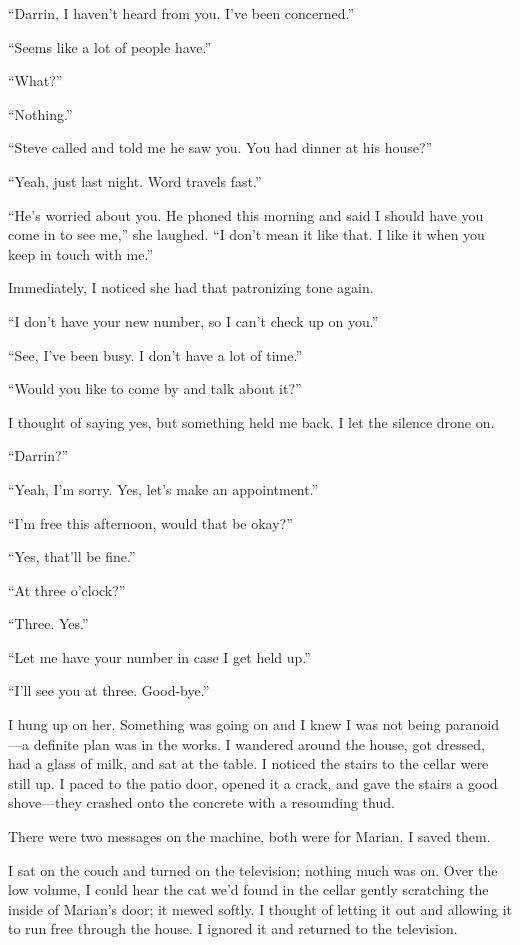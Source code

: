 ``Darrin, I haven't heard from you. I've been concerned.''

``Seems like a lot of people have.''

``What?''

``Nothing.''

``Steve called and told me he saw you. You had dinner at his house?''

``Yeah, just last night. Word travels fast.''

``He's worried about you. He phoned this morning and said I should have
you come in to see me,'' she laughed. ``I don't mean it like that. I
like it when you keep in touch with me.''

Immediately, I noticed she had that patronizing tone again.

``I don't have your new number, so I can't check up on you.''

``See, I've been busy. I don't have a lot of time.''

``Would you like to come by and talk about it?''

I thought of saying yes, but something held me back. I let the silence
drone on.

``Darrin?''

``Yeah, I'm sorry. Yes, let's make an appointment.''

``I'm free this afternoon, would that be okay?''

``Yes, that'll be fine.''

``At three o'clock?''

``Three. Yes.''

``Let me have your number in case I get held up.''

``I'll see you at three. Good-bye.''

I hung up on her. Something was going on and I knew I was not being
paranoid---a definite plan was in the works. I wandered around the
house, got dressed, had a glass of milk, and sat at the table. I noticed
the stairs to the cellar were still up. I paced to the patio door,
opened it a crack, and gave the stairs a good shove---they crashed onto
the concrete with a resounding thud.

There were two messages on the machine, both were for Marian. I saved
them.

I sat on the couch and turned on the television; nothing much was on.
Over the low volume, I could hear the cat we'd found in the cellar
gently scratching the inside of Marian's door; it mewed softly. I
thought of letting it out and allowing it to run free through the house.
I ignored it and returned to the television.

